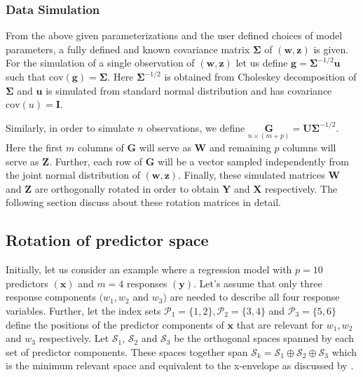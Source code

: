 \documentclass[num-refs]{wiley-article}
\begin{document}
\subsubsection{Data Simulation}\label{data-simulation}

From the above given parameterizations and the user defined choices of
model parameters, a fully defined and known covariance matrix
\(\boldsymbol{\Sigma}\) of \((\mathbf{w, z})\) is given. For the
simulation of a single observation of \((\mathbf{w, z})\) let us define
\(\mathbf{g} = \boldsymbol{\Sigma}^{-1/2}\mathbf{u}\) such that
\(\text{cov}(\mathbf{g}) = \boldsymbol{\Sigma}\). Here
\(\boldsymbol{\Sigma}^{-1/2}\) is obtained from Choleskey decomposition
of \(\boldsymbol{\Sigma}\) and \(\mathbf{u}\) is simulated from standard
normal distribution and has covariance \(\text{cov}(u) = \mathbf{I}\).

Similarly, in order to simulate \(n\) observations, we define
\(\underset{n \times (m + p)}{\mathbf{G}} = \mathbf{U}\boldsymbol{\Sigma}^{-1/2}\).
Here the first \(m\) columns of \(\mathbf{G}\) will serve as
\(\mathbf{W}\) and remaining \(p\) columns will serve as \(\mathbf{Z}\).
Further, each row of \(\mathbf{G}\) will be a vector sampled
independently from the joint normal distribution of
\(\left(\mathbf{w}, \mathbf{z}\right)\). Finally, these simulated
matrices \(\mathbf{W}\) and \(\mathbf{Z}\) are orthogonally rotated in
order to obtain \(\mathbf{Y}\) and \(\mathbf{X}\) respectively. The
following section discuss about these rotation matrices in detail.

\subsection{Rotation of predictor
space}\label{rotation-of-predictor-space}

Initially, let us consider an example where a regression model with
\(p = 10\) predictors \((\mathbf{x})\) and \(m = 4\) responses
\((\mathbf{y})\). Let's assume that only three response components
\((w_1, w_2\) and \(w_3)\) are needed to describe all four response
variables. Further, let the index sets
\(\mathcal{P}_1 = \{1, 2\}, \mathcal{P}_2 = \{3, 4\}\) and
\(\mathcal{P}_3 = \{5, 6\}\) define the positions of the predictor
components of \(\mathbf{x}\) that are relevant for \(w_1, w_2\) and
\(w_3\) respectively. Let \(\mathcal{S}_1\), \(\mathcal{S}_2\) and
\(\mathcal{S}_3\) be the orthogonal spaces spanned by each set of
predictor components. These spaces together span
\(\mathcal{S}_k = \mathcal{S}_1 \oplus \mathcal{S}_2 \oplus \mathcal{S}_3\)
which is the minimum relevant space and equivalent to the x-envelope as
discussed by \citet{cook2013envelopes}.
\end{document}
